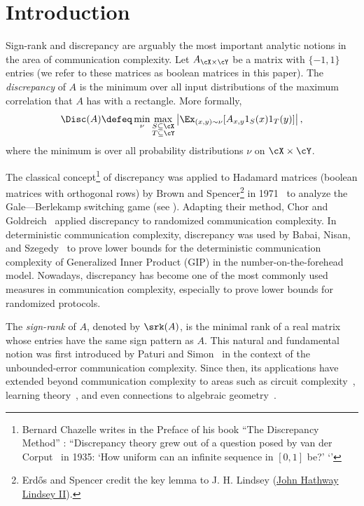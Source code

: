 
%
%
%


\section{Introduction}

Sign-rank and discrepancy are arguably the most important analytic notions in the area of communication complexity. Let $A_{\cX \times \cY}$ be a matrix with $\{-1,1\}$ entries (we refer to these matrices as boolean matrices in this paper).
The \emph{discrepancy} of $A$ is the minimum over all input distributions 
of the maximum correlation that $A$ has with a rectangle.  More formally,
\begin{equation} 
\label{eq:disc}
\Disc(A) \defeq \min_{\nu} \max_{\substack{S \subseteq  \cX \\ T \subseteq \cY}}\left| \Ex_{(x,y) \sim \nu} [A_{x,y} 1_S(x) 1_T(y)]\right|,
\end{equation}
where the minimum is over all probability distributions $\nu$ on 
$\cX \times \cY$.
%
%
%
%
%
%
%
%
%
%
%
%
%
%
%
%
%
%
%
%
%
%
%
%
%
%
%
%
%

The classical concept\footnote{Bernard Chazelle writes in the Preface of his book ``The Discrepancy Method'' \cite{chazelle}:
``Discrepancy theory grew out of a question posed by van der Corput~\cite{corput} in 1935: `How uniform can an infinite sequence in $[0,1]$ be?' ‘'} of discrepancy was applied to Hadamard matrices (boolean matrices with orthogonal rows) by Brown and Spencer\footnote{Erd\H{o}s and Spencer credit the key lemma to J. H. Lindsey (\href{https://www.mathgenealogy.org/id.php?id=106133}{John Hathway Lindsey II}).} in 1971~\cite{switching-game} to analyze the Gale—Berlekamp switching game (see \cite[Ch. 15]{erdos-spencer}). Adapting their method, Chor and Goldreich~\cite{chor1988unbiased} applied discrepancy to randomized communication complexity. In deterministic communication complexity,  discrepancy was used by Babai, Nisan, and Szegedy~\cite{babai1992multiparty} to prove lower bounds for the deterministic communication complexity of Generalized Inner Product (GIP) in the number-on-the-forehead model. Nowadays, discrepancy has become one of the most commonly used measures in communication complexity, especially to prove lower bounds for randomized protocols.




The \emph{sign-rank} of $A$, denoted by $\srk(A)$, is the minimal rank 
of a real matrix
whose entries have the same sign pattern as $A$. This natural and fundamental
notion was  first introduced  by Paturi and 
Simon~\cite{paturi1986probabilistic} in the context of the unbounded-error communication complexity.  Since then,  its applications have extended beyond communication complexity   to areas  such as    circuit complexity~\cite{MR2592035,MR3577098}, learning theory~\cite{MR2359826,MR2497381,MR2059097}, and even connections to algebraic geometry~\cite{MR0226281}.


